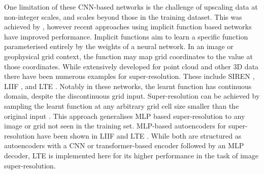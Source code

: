 \documentclass[manuscript.tex]{subfiles}
\begin{document}
One limitation of these CNN-based networks is the challenge of upscaling data at non-integer scales, and scales beyond those in the training dataset.
This was achieved by \parencite{huMetaSRMagnificationarbitraryNetwork2019,wangLearningSingleNetwork2021}, however recent approaches using implicit function based networks have improved performance.
Implicit functions aim to learn a specific function parameterised entirely by the weights of a neural network.
In an image or geophysical grid context, the function may map grid coordinates to the value at those coordinates.
While extensively developed for point cloud and other 3D data \parencite[e.g.][]{jiangLocalImplicitGrid2020} there have been numerous examples for super-resolution.
These include SIREN \parencite{sitzmann2019siren}, LIIF \parencite{chenLearningContinuousImage2021}, and LTE \parencite{leeLocalTextureEstimator2022}.
Notably in these networks, the learnt function has continuous domain, despite the discontinuous grid input.
Super-resolution can be achieved by sampling the learnt function at any arbitrary grid cell size smaller than the original input \parencite{chenLearningContinuousImage2021}.
This approach generalises MLP based super-resolution to any image or grid not seen in the training set.
MLP-based autoencoders for super-resolution have been shown in LIIF \parencite{chenLearningContinuousImage2021} and LTE \parencite{leeLocalTextureEstimator2022}.
While both are structured as autoencoders with a CNN or transformer-based encoder followed by an MLP decoder, LTE is implemented here for its higher performance in the task of image super-resolution.
\end{document}
